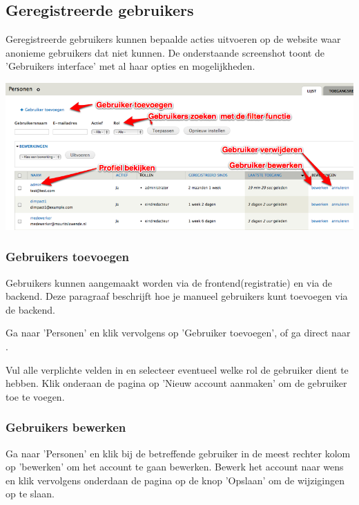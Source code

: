 \subsection{Geregistreerde gebruikers}

Geregistreerde gebruikers kunnen bepaalde acties uitvoeren op de website waar anonieme gebruikers dat niet kunnen. 
De onderstaande screenshot toont de 'Gebruikers interface' met al haar opties en mogelijkheden.

\bigskip

\begin{center}
	\includegraphics[width=\textwidth]{img/gebruikers1.png}
\end{center}

\subsubsection{Gebruikers toevoegen}

Gebruikers kunnen aangemaakt worden via de frontend(registratie) en via de backend. Deze paragraaf beschrijft hoe je manueel gebruikers kunt toevoegen via de backend. 

Ga naar 'Personen' en klik vervolgens op 'Gebruiker toevoegen', of ga direct naar .

Vul alle verplichte velden in en selecteer eventueel welke rol de gebruiker dient te hebben.
Klik onderaan de pagina op 'Nieuw account aanmaken' om de gebruiker toe te voegen.

\subsubsection{Gebruikers bewerken}

Ga naar 'Personen' en klik bij de betreffende gebruiker in de meest rechter kolom op 'bewerken' om het account te gaan bewerken. 
Bewerk het account naar wens en klik vervolgens onderdaan de pagina op de knop 'Opslaan' om de wijzigingen op te slaan.


